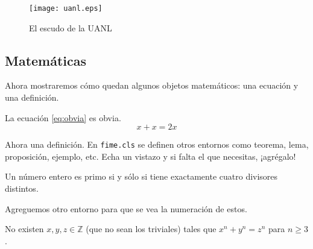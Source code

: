 \begin{figure}[htp]
	\centering
		\texttt{[image: uanl.eps]}
	\caption{El escudo de la UANL}
	\label{fig:uanl}
\end{figure}

\subsection{Matemáticas}

Ahora mostraremos cómo quedan algunos objetos matemáticos: una ecuación y una definición.

La ecuación \eqref{eq:obvia} es obvia.
\begin{equation}
	x + x = 2x
	\label{eq:obvia}
\end{equation}

Ahora una definición. En {\tt fime.cls} se definen otros entornos como teorema, lema, proposición, ejemplo, etc. Echa un vistazo y si falta el que necesitas, ¡agrégalo!

\begin{definicion}
	Un número entero es primo si y sólo si tiene exactamente cuatro divisores distintos.
\end{definicion}

Agreguemos otro entorno para que se vea la numeración de estos.

\begin{teorema}[Fermat]
	No existen $x,y,z \in \mathbb{Z}$ (que no sean los triviales) tales que $x^n + y^n = z^n$ para $n \geq 3$.
\end{teorema}
